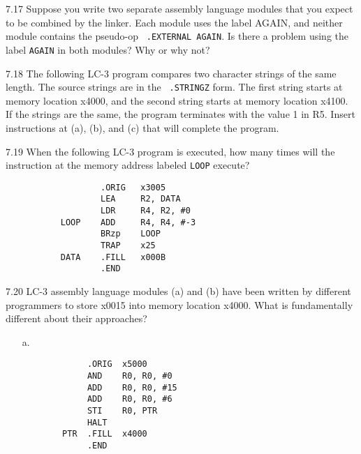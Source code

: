 \documentclass{patt}
\begin{document}
\begin{exercises}
\item[7.17] Suppose you write two separate assembly language modules
  that you expect to be combined by the linker.  Each module uses the
  label AGAIN, and neither module contains the pseudo-op {\tt
    .EXTERNAL AGAIN}.  Is there a problem using the label
  {\tt AGAIN} in both modules? Why or why not?

\item[7.18] The following LC-3 program compares two character strings
  of the same length. The source strings are in the {\tt
    .STRINGZ} form.  The first string starts at memory location x4000,
  and the second string starts at memory location x4100.  If the
  strings are the same, the program terminates with the value 1 in R5.
  Insert instructions at (a), (b), and (c) that will complete the
  program.\enlargethispage{15pt}


\item[7.19] When the following LC-3 program is executed, how many
  times will the instruction at the memory address labeled
  {\tt LOOP} execute?
\medskip
\begin{lstlisting}
                   .ORIG   x3005
                   LEA     R2, DATA
                   LDR     R4, R2, #0
           LOOP    ADD     R4, R4, #-3
                   BRzp    LOOP
                   TRAP    x25
           DATA    .FILL   x000B
                   .END
\end{lstlisting}



\item[7.20] LC-3 assembly language modules (a) and (b) have been
  written by different programmers to store x0015 into memory location
  x4000. What is fundamentally different about their approaches?
\begin{enumerate}[a.]
\item[a.]
\begin{lstlisting}
             .ORIG  x5000
             AND    R0, R0, #0
             ADD    R0, R0, #15
             ADD    R0, R0, #6
             STI    R0, PTR
             HALT
        PTR  .FILL  x4000
             .END
\end{lstlisting}


\end{enumerate}
\end{exercises}
\end{document}
